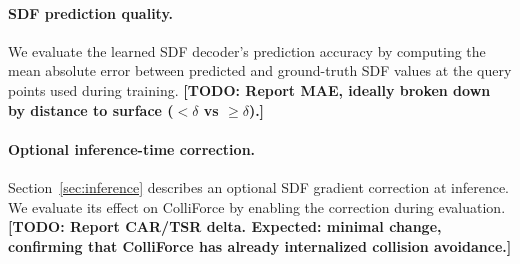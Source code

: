 \paragraph{SDF prediction quality.} We evaluate the learned SDF decoder's prediction accuracy by computing the mean absolute error between predicted and ground-truth SDF values at the query points used during training. \textbf{[TODO: Report MAE, ideally broken down by distance to surface ($< \delta$ vs $\geq \delta$).]}

\paragraph{Optional inference-time correction.} Section~\ref{sec:inference} describes an optional SDF gradient correction at inference. We evaluate its effect on ColliForce by enabling the correction during evaluation. \textbf{[TODO: Report CAR/TSR delta. Expected: minimal change, confirming that ColliForce has already internalized collision avoidance.]}